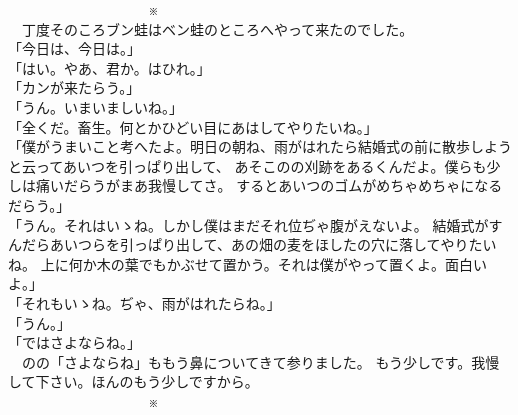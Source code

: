 \documentclass[
a4paper,
book]
{tarticle}
\begin{document}
　　　　　　　　　　※\\

　丁度そのころブン蛙はベン蛙のところへやって来たのでした。\\
「今日は、今日は。」\\
「はい。やあ、君か。はひれ。」\\
「カンが来たらう。」\\
「うん。いまいましいね。」\\
「全くだ。畜生。何とかひどい目にあはしてやりたいね。」\\
「僕がうまいこと考へたよ。明日の朝ね、雨がはれたら結婚式の前に散歩しようと云ってあいつを引っぱり出して、
あそこのの刈跡をあるくんだよ。僕らも少しは痛いだらうがまあ我慢してさ。
するとあいつのゴムがめちゃめちゃになるだらう。」\\
「うん。それはいゝね。しかし僕はまだそれ位ぢゃ腹がえないよ。
結婚式がすんだらあいつらを引っぱり出して、あの畑の麦をほしたの穴に落してやりたいね。
上に何か木の葉でもかぶせて置かう。それは僕がやって置くよ。面白いよ。」\\
「それもいゝね。ぢゃ、雨がはれたらね。」\\
「うん。」\\
「ではさよならね。」\\
　のの「さよならね」ももう鼻についてきて参りました。
もう少しです。我慢して下さい。ほんのもう少しですから。\\

　　　　　　　　　　※\\
\end{document}
